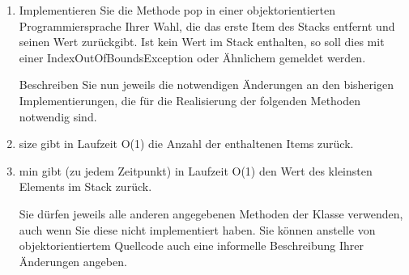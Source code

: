 \documentclass{lehramt-informatik-aufgabe}
\begin{document}
\begin{enumerate}


\item Implementieren Sie die Methode pop in einer objektorientierten
Programmiersprache Ihrer Wahl, die das erste Item des Stacks entfernt
und seinen Wert zurückgibt. Ist kein Wert im Stack enthalten, so soll
dies mit einer IndexOutOfBoundsException oder Ähnlichem gemeldet werden.

Beschreiben Sie nun jeweils die notwendigen Änderungen an den bisherigen
Implementierungen, die für die Realisierung der folgenden Methoden
notwendig sind.

\begin{liAntwort}
\end{liAntwort}


\item size gibt in Laufzeit O(1) die Anzahl der enthaltenen Items zurück.

\begin{liAntwort}
\end{liAntwort}


\item min gibt (zu jedem Zeitpunkt) in Laufzeit O(1) den Wert des
kleinsten Elements im Stack zurück.

\begin{liAntwort}
\end{liAntwort}

Sie dürfen jeweils alle anderen angegebenen Methoden der Klasse
verwenden, auch wenn Sie diese nicht implementiert haben. Sie können
anstelle von objektorientiertem Quellcode auch eine informelle
Beschreibung Ihrer Änderungen angeben.

\end{enumerate}

\begin{liAdditum}
\end{liAdditum}
\end{document}
